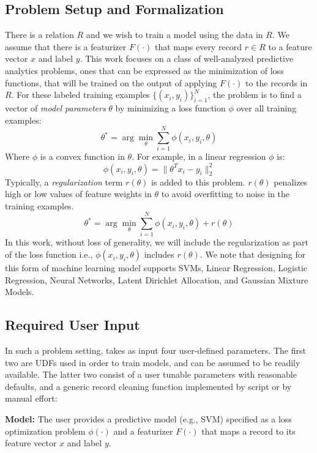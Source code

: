 \subsection{Problem Setup and Formalization}
There is a relation $R$ and we wish to train a model using the data in $R$.
We assume that there is a featurizer $F(\cdot)$ that maps every record $r \in R$ to a feature vector $x$ and label $y$.
This work focuses on a class of well-analyzed predictive analytics problems, ones that can be expressed as the minimization of loss functions, that will be trained on the output of applying $F(\cdot)$ to the records in $R$.
For these labeled training examples $\{(x_{i},y_{i})\}_{i=1}^{N}$, the problem is to find a vector of \emph{model parameters} $\theta$ by minimizing a loss function $\phi$ over all training examples:
\[
 \theta^{*}=\arg\min_{\theta}\sum_{i=1}^{N}\phi(x_{i},y_{i},\theta)
\]
Where $\phi$ is a convex function in $\theta$.
For example, in a linear regression $\phi$ is:
\[
\phi(x_{i},y_{i},\theta) = \|\theta^Tx_{i} - y_i \|_2^2
\]
Typically, a \emph{regularization} term $r(\theta)$ is added to this problem.
$r(\theta)$ penalizes high or low values of feature weights in $\theta$ to avoid overfitting to noise in the training examples.
\begin{equation}
 \theta^{*}=\arg\min_{\theta}\sum_{i=1}^{N}\phi(x_{i},y_{i},\theta) + r(\theta)
 \label{ideal}
\end{equation}
In this work, without loss of generality, we will include the regularization as part of the loss function i.e., $\phi(x_{i},y_{i},\theta)$ includes $r(\theta)$.
We note that designing \sys for this form of machine learning model supports SVMs, Linear Regression, Logistic Regression, Neural Networks, Latent Dirichlet Allocation, and Gaussian Mixture Models.

\subsection{Required User Input}\label{uinp}
In such a problem setting, \sys takes as input four user-defined parameters.  The first two are UDFs used in order to train models, and can be assumed to be readily available.  
The latter two consist of a user tunable parameters with reasonable defaults,
and a generic record cleaning function implemented by script or by manual effort:

\noindent\textbf{Model:} The user provides a predictive model (e.g., SVM) specified as a loss optimization problem $\phi(\cdot)$ and a featurizer $F(\cdot)$ that maps a record to its feature vector $x$ and label $y$.

